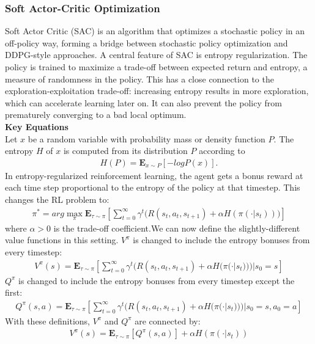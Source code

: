 \subsubsection{Soft Actor-Critic Optimization}
Soft Actor Critic (SAC) is an algorithm that optimizes a stochastic policy in an off-policy way, forming a bridge between stochastic policy optimization and DDPG-style approaches. A central feature of SAC is entropy regularization. The policy is trained to maximize a trade-off between expected return and entropy, a measure of randomness in the policy. This has a close connection to the exploration-exploitation trade-off: increasing entropy results in more exploration, which can accelerate learning later on. It can also prevent the policy from prematurely converging to a bad local optimum.\\
\textbf{Key Equations}\\
Let $x$ be a random variable with probability mass or density function $P$. The entropy $H$ of $x$ is computed from its distribution $P$ according to
\begin{align*}
    H(P)=\mathbf{E}_{x\sim P}[-logP(x)].
\end{align*}
In entropy-regularized reinforcement learning, the agent gets a bonus reward at each time step proportional to the entropy of the policy at that timestep. This changes the RL problem to:
\begin{align*}
    \pi^{\ast}=arg \max_{\pi}\mathbf{E}_{\tau \sim \pi}\left[\sum^{\infty}_{t=0} \gamma^t \Big (R(s_t,a_t,s_{t+1})+\alpha H(\pi(\cdot|s_t))  \Big) \right]
\end{align*}
where $\alpha > 0$ is the trade-off coefficient.We can now define the slightly-different value functions in this setting. $ V^{\pi} $ is changed to include the entropy bonuses from every timestep:
\begin{align*}
     V^{\pi}(s)= \mathbf{E}_{\tau \sim \pi}\left[\sum^{\infty}_{t=0} \gamma^t \Big (R(s_t,a_t,s_{t+1})+\alpha H(\pi(\cdot|s_t))  \Big)|s_0=s \right]
\end{align*}
$Q^{\pi}$ is changed to include the entropy bonuses from every timestep except the first:
\begin{align*}
     Q^{\pi}(s,a)= \mathbf{E}_{\tau \sim \pi}\left[\sum^{\infty}_{t=0} \gamma^t \Big (R(s_t,a_t,s_{t+1})+\alpha H(\pi(\cdot|s_t))  \Big)|s_0=s,a_0=a \right]
\end{align*}
With these definitions, $V^{\pi}$ and $Q^{\pi}$ are connected by:
\begin{align*}
     V^{\pi}(s)= \mathbf{E}_{\tau \sim \pi}[Q^{\pi}(s,a)]+\alpha H(\pi(\cdot|s_t))
\end{align*}
